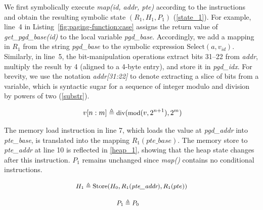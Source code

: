 We first symbolically execute \textit{map(id, addr, pte)} according to the instructions and obtain the resulting symbolic state $(R_1, H_1, P_1)$ (\autoref{state_1}). For example, line~4 in Listing~\autoref{fig:paging-function:case} assigns the return value of \textit{get\_pgd\_base(id)} to the local variable \textit{pgd\_base}. Accordingly, we add a mapping in $R_1$ from the string \textit{pgd\_base} to the symbolic expression $\text{Select}(a, v_{\mathit{id}})$. Similarly, in line~5, the bit-manipulation operations extract bits 31--22 from \textit{addr}, multiply the result by 4 (aligned to a 4-byte entry), and store it in \textit{pgd\_idx}. For brevity, we use the notation \textit{addr[31:22]} to denote extracting a slice of bits from a variable, which is syntactic sugar for a sequence of integer modulo and division by powers of two (\autoref{substr}).

\begin{equation}\
\label{substr}
\small
v[n:m] \triangleq \\
\text{div}( \text{mod}(v, 2^{n+1}), 2^{m})
\end{equation}

The memory load instruction in line 7, which loads the value at \textit{pgd\_addr} into \textit{pte\_base}, is translated into the mapping $R_1(\textit{pte\_base})$. The memory store to \textit{pte\_addr} at line 10 is reflected in \autoref{heap_1}, showing that the heap state changes after this instruction. $P_1$ remains unchanged since \textit{map()} contains no conditional instructions.

\begin{equation}
\label{heap_1}
\small
\begin{aligned}
& H_1 \triangleq \text{Store}(H_0, R_1(\textit{pte\_addr}), R_1(pte))\\
\end{aligned}
\end{equation}

\begin{equation}
\small
\begin{aligned}
& P_1 \triangleq P_0
\end{aligned}
\end{equation}

